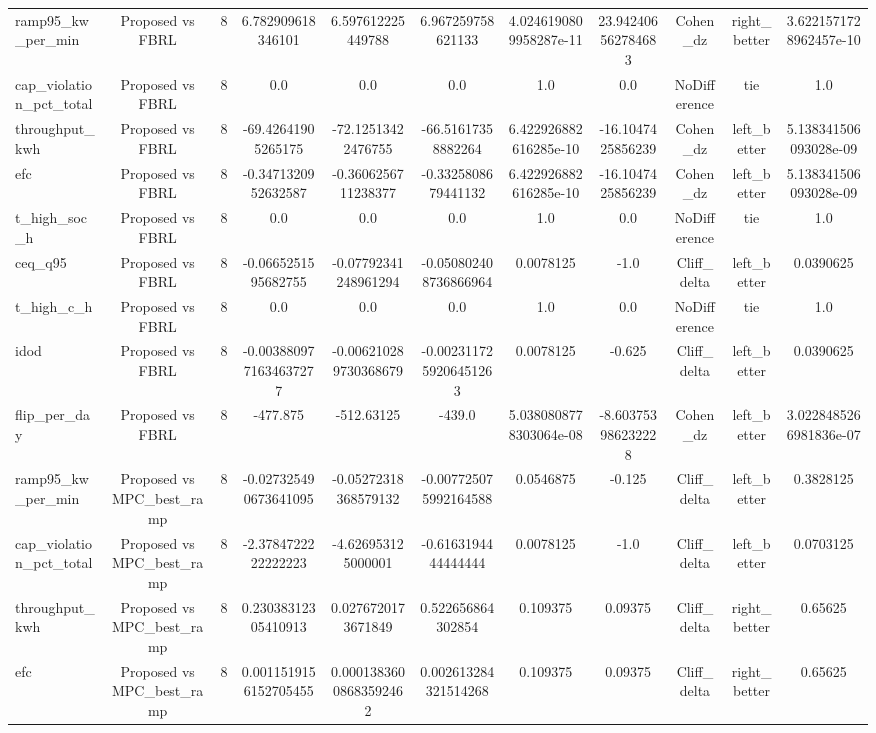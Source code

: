 \begin{table}[t]
\begin{tabular}{lcccccccccc}
ramp95\_kw\_per\_min & Proposed vs FBRL & 8 & 6.782909618346101 & 6.597612225449788 & 6.967259758621133 & 4.0246190809958287e-11 & 23.942406562784683 & Cohen\_dz & right\_better & 3.6221571728962457e-10 \\
cap\_violation\_pct\_total & Proposed vs FBRL & 8 & 0.0 & 0.0 & 0.0 & 1.0 & 0.0 & NoDifference & tie & 1.0 \\
throughput\_kwh & Proposed vs FBRL & 8 & -69.42641905265175 & -72.12513422476755 & -66.51617358882264 & 6.422926882616285e-10 & -16.1047425856239 & Cohen\_dz & left\_better & 5.138341506093028e-09 \\
efc & Proposed vs FBRL & 8 & -0.3471320952632587 & -0.3606256711238377 & -0.3325808679441132 & 6.422926882616285e-10 & -16.1047425856239 & Cohen\_dz & left\_better & 5.138341506093028e-09 \\
t\_high\_soc\_h & Proposed vs FBRL & 8 & 0.0 & 0.0 & 0.0 & 1.0 & 0.0 & NoDifference & tie & 1.0 \\
ceq\_q95 & Proposed vs FBRL & 8 & -0.0665251595682755 & -0.07792341248961294 & -0.050802408736866964 & 0.0078125 & -1.0 & Cliff\_delta & left\_better & 0.0390625 \\
t\_high\_c\_h & Proposed vs FBRL & 8 & 0.0 & 0.0 & 0.0 & 1.0 & 0.0 & NoDifference & tie & 1.0 \\
idod & Proposed vs FBRL & 8 & -0.0038809771634637277 & -0.006210289730368679 & -0.0023117259206451263 & 0.0078125 & -0.625 & Cliff\_delta & left\_better & 0.0390625 \\
flip\_per\_day & Proposed vs FBRL & 8 & -477.875 & -512.63125 & -439.0 & 5.0380808778303064e-08 & -8.603753986232228 & Cohen\_dz & left\_better & 3.0228485266981836e-07 \\
ramp95\_kw\_per\_min & Proposed vs MPC\_best\_ramp & 8 & -0.027325490673641095 & -0.05272318368579132 & -0.007725075992164588 & 0.0546875 & -0.125 & Cliff\_delta & left\_better & 0.3828125 \\
cap\_violation\_pct\_total & Proposed vs MPC\_best\_ramp & 8 & -2.3784722222222223 & -4.626953125000001 & -0.6163194444444444 & 0.0078125 & -1.0 & Cliff\_delta & left\_better & 0.0703125 \\
throughput\_kwh & Proposed vs MPC\_best\_ramp & 8 & 0.23038312305410913 & 0.0276720173671849 & 0.522656864302854 & 0.109375 & 0.09375 & Cliff\_delta & right\_better & 0.65625 \\
efc & Proposed vs MPC\_best\_ramp & 8 & 0.0011519156152705455 & 0.00013836008683592462 & 0.002613284321514268 & 0.109375 & 0.09375 & Cliff\_delta & right\_better & 0.65625 \\

\end{tabular}
\end{table}
